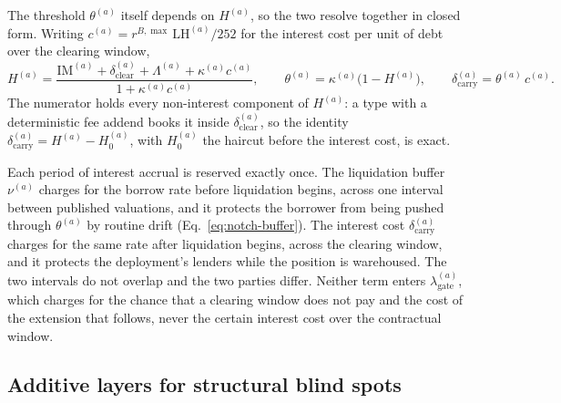 The threshold $\theta^{(a)}$ itself depends on $H^{(a)}$, so the two resolve together in closed form. Writing $c^{(a)} = r^{B,\max}\,\mathrm{LH}^{(a)}/252$ for the interest cost per unit of debt over the clearing window,
\begin{equation}\label{eq:carry-solve}
H^{(a)} = \frac{\mathrm{IM}^{(a)} + \delta_{\mathrm{clear}}^{(a)} + \Lambda^{(a)} + \kappa^{(a)} c^{(a)}}{1 + \kappa^{(a)} c^{(a)}},
\qquad
\theta^{(a)} = \kappa^{(a)}\bigl(1 - H^{(a)}\bigr),
\qquad
\delta_{\mathrm{carry}}^{(a)} = \theta^{(a)}\, c^{(a)} .
\end{equation}
The numerator holds every non-interest component of $H^{(a)}$: a type with a deterministic fee addend books it inside $\delta_{\mathrm{clear}}^{(a)}$, so the identity $\delta_{\mathrm{carry}}^{(a)} = H^{(a)} - H_0^{(a)}$, with $H_0^{(a)}$ the haircut before the interest cost, is exact.

Each period of interest accrual is reserved exactly once. The liquidation buffer $\nu^{(a)}$ charges for the borrow rate before liquidation begins, across one interval between published valuations, and it protects the borrower from being pushed through $\theta^{(a)}$ by routine drift (Eq.~\eqref{eq:notch-buffer}). The interest cost $\delta_{\mathrm{carry}}^{(a)}$ charges for the same rate after liquidation begins, across the clearing window, and it protects the deployment's lenders while the position is warehoused. The two intervals do not overlap and the two parties differ. Neither term enters $\lambda_{\mathrm{gate}}^{(a)}$, which charges for the chance that a clearing window does not pay and the cost of the extension that follows, never the certain interest cost over the contractual window.

\subsection{Additive layers for structural blind spots}\label{sec:theory:layers}

